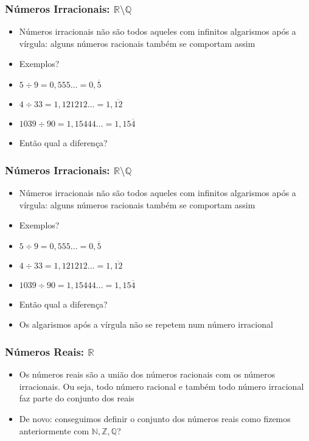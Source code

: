 \documentclass[usenames,dvipsnames,svgnames]{beamer}
\begin{document}
\begin{frame}
	
	\frametitle{Números Irracionais: $\mathbb{R} \setminus \mathbb{Q}$}

	\begin{itemize}
		\item Números irracionais não são todos aqueles com infinitos algarismos após a vírgula: alguns números racionais também se comportam assim
		\item Exemplos?
		\item $5 \div 9 = 0,555\dots = 0,\overline{5}$
		\item $4 \div 33 = 1,121212\dots = 1,\overline{12}$
		\item $1039 \div 90 = 1,15444\dots = 1,15\overline{4}$
		\item Então qual a diferença?
	\end{itemize}

\end{frame}

\begin{frame}
	
	\frametitle{Números Irracionais: $\mathbb{R} \setminus \mathbb{Q}$}

	\begin{itemize}
		\item Números irracionais não são todos aqueles com infinitos algarismos após a vírgula: alguns números racionais também se comportam assim
		\item Exemplos?
		\item $5 \div 9 = 0,555\dots = 0,\overline{5}$
		\item $4 \div 33 = 1,121212\dots = 1,\overline{12}$
		\item $1039 \div 90 = 1,15444\dots = 1,15\overline{4}$
		\item Então qual a diferença?
		\item Os algarismos após a vírgula {\color{red}não se repetem} num número irracional
	\end{itemize}

\end{frame}

\begin{frame}
	
	\frametitle{Números Reais: $\mathbb{R}$}

	\begin{itemize}
		\item Os números reais são a união dos números racionais com os números irracionais. Ou seja, todo número racional e também todo número irracional faz parte do conjunto dos reais
		\item De novo: conseguimos definir o conjunto dos números reais como fizemos anteriormente com $\mathbb{N}, \mathbb{Z}, \mathbb{Q}$?
	\end{itemize}

\end{frame}
\end{document}
